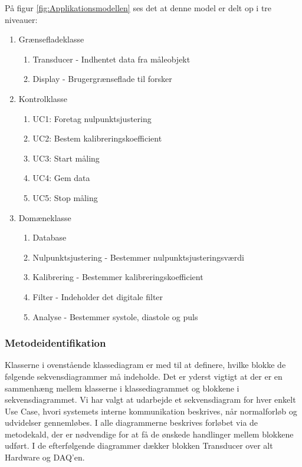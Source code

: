 På figur \ref{fig:Applikationsmodellen} ses det at denne model er delt op i tre niveauer:
\begin{enumerate}
\item Grænsefladeklasse
\begin{enumerate}
\item Transducer - Indhentet data fra måleobjekt
\item Display - Brugergrænseflade til forsker
\end{enumerate}
\item Kontrolklasse
\begin{enumerate}
\item UC1: Foretag nulpunktsjustering
\item UC2: Bestem kalibreringskoefficient
\item UC3: Start måling
\item UC4: Gem data
\item UC5: Stop måling
\end{enumerate}
\item Domæneklasse
\begin{enumerate}
\item Database
\item Nulpunktsjustering - Bestemmer nulpunktsjusteringsværdi
\item Kalibrering - Bestemmer kalibreringskoefficient
\item Filter - Indeholder det digitale filter
\item Analyse - Bestemmer systole, diastole og puls
\end{enumerate}
\end{enumerate}

\subsubsection{Metodeidentifikation}
Klasserne i ovenstående klassediagram er med til at definere, hvilke blokke de følgende sekvensdiagrammer må indeholde. Det er yderst vigtigt at der er en sammenhæng mellem klasserne i klassediagrammet og blokkene i sekvensdiagrammet. Vi har valgt at udarbejde et sekvensdiagram for hver enkelt Use Case, hvori systemets interne kommunikation beskrives, når normalforløb og udvidelser gennemløbes. I alle diagrammerne beskrives forløbet via de metodekald, der er nødvendige for at få de ønskede handlinger mellem blokkene udført. I de efterfølgende diagrammer dækker blokken Transducer over alt Hardware og DAQ'en.  

